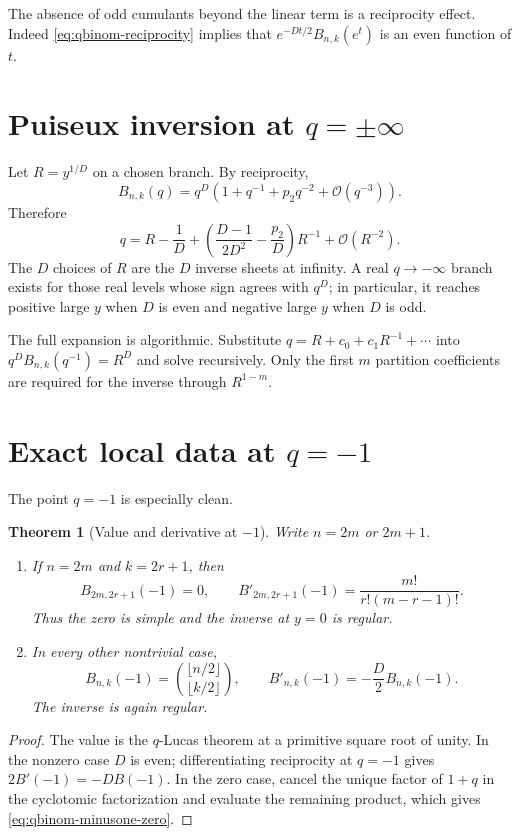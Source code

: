 \documentclass[11pt,oneside]{book}
\newtheorem{theorem}{Theorem}[chapter]
\theoremstyle{definition}
\theoremstyle{remark}
\newcommand{\OO}{\mathcal{O}}
\begin{document}
The absence of odd cumulants beyond the linear term is a reciprocity effect.
Indeed \eqref{eq:qbinom-reciprocity} implies that
$e^{-Dt/2}B_{n,k}(e^t)$ is an even function of $t$.

\section{Puiseux inversion at $q=\pm\infty$}
Let $R=y^{1/D}$ on a chosen branch.  By reciprocity,
\[
 B_{n,k}(q)=q^D\left(1+q^{-1}+p_2q^{-2}+\OO(q^{-3})\right).
\]
Therefore
\begin{equation}\label{eq:qbinom-infty-inverse}
 q=R-\frac1D
 +\left(\frac{D-1}{2D^2}-\frac{p_2}{D}\right)R^{-1}
 +\OO(R^{-2}).
\end{equation}
The $D$ choices of $R$ are the $D$ inverse sheets at infinity.  A real
$q\to-\infty$ branch exists for those real levels whose sign agrees with
$q^D$; in particular, it reaches positive large $y$ when $D$ is even and
negative large $y$ when $D$ is odd.

The full expansion is algorithmic.  Substitute
$q=R+c_0+c_1R^{-1}+\cdots$ into
$q^DB_{n,k}(q^{-1})=R^D$ and solve recursively.  Only the first $m$
partition coefficients are required for the inverse through $R^{1-m}$.

\section{Exact local data at $q=-1$}
The point $q=-1$ is especially clean.

\begin{theorem}[Value and derivative at $-1$]\label{thm:qbinom-minus-one}
Write $n=2m$ or $2m+1$.
\begin{enumerate}
\item If $n=2m$ and $k=2r+1$, then
\begin{equation}\label{eq:qbinom-minusone-zero}
 B_{2m,2r+1}(-1)=0,
 \qquad
 B'_{2m,2r+1}(-1)
 =\frac{m!}{r!(m-r-1)!}.
\end{equation}
Thus the zero is simple and the inverse at $y=0$ is regular.
\item In every other nontrivial case,
\begin{equation}\label{eq:qbinom-minusone-value}
 B_{n,k}(-1)=\binom{\lfloor n/2\rfloor}{\lfloor k/2\rfloor},
 \qquad
 B'_{n,k}(-1)=-\frac D2B_{n,k}(-1).
\end{equation}
The inverse is again regular.
\end{enumerate}
\end{theorem}
\begin{proof}
The value is the $q$-Lucas theorem at a primitive square root of unity.  In the
nonzero case $D$ is even; differentiating reciprocity at $q=-1$ gives
$2B'(-1)=-DB(-1)$.  In the zero case, cancel the unique factor of
$1+q$ in the cyclotomic factorization and evaluate the remaining product,
which gives \eqref{eq:qbinom-minusone-zero}.
\end{proof}
\end{document}
